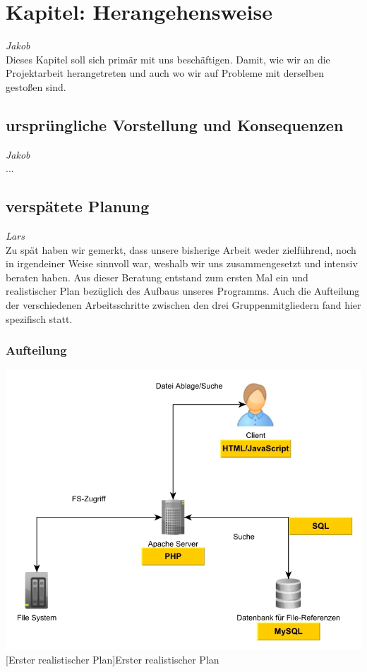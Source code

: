 \documentclass[12pt,a4paper,bibliography=totocnumbered,listof=totocnumbered]{scrartcl}
\begin{document}
\onehalfspacing
\renewcommand{\thesection}{\arabic{section}}
\renewcommand{\theHsection}{\arabic{section}}
\setcounter{section}{0}
\setcounter{page}{1}

\section{Kapitel: Herangehensweise}
\emph{Jakob}\\
Dieses Kapitel soll sich primär mit uns beschäftigen.
Damit, wie wir an die Projektarbeit herangetreten und auch wo wir auf Probleme mit derselben gestoßen sind.

\subsection{ursprüngliche Vorstellung und Konsequenzen}
\emph{Jakob}\\
...

\subsection{verspätete Planung}
\emph{Lars}\\
Zu spät haben wir gemerkt, dass unsere bisherige Arbeit weder zielführend, noch in irgendeiner Weise sinnvoll war, weshalb wir uns zusammengesetzt und intensiv beraten haben. Aus dieser Beratung entstand zum ersten Mal ein und realistischer Plan bezüglich des Aufbaus unseres Programms. Auch die Aufteilung der verschiedenen Arbeitsschritte zwischen den  drei Gruppenmitgliedern fand hier spezifisch statt.

\subsubsection{Aufteilung}
\label{sec:Aufteilung}

\vspace{1em}
\begin{minipage}{\linewidth}
	\centering
	\includegraphics[width=0.7\linewidth]{Bilder/Projekt-Entwurf.jpg}
	[Erster realistischer Plan]{Erster realistischer Plan}
	\label{fig:plan1}
\end{minipage}
\vspace{1em}
\end{document}
